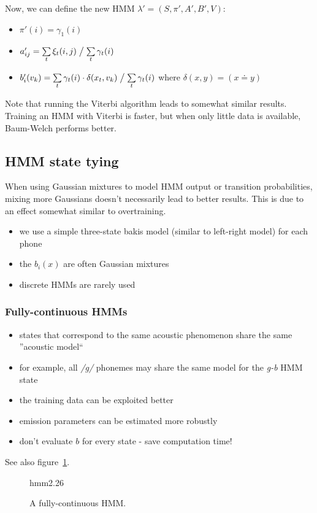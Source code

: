 \documentclass[11pt]{article}
\begin{document}
Now, we can define the new HMM $\lambda' = (S, \pi', A', B', V)$:
\begin{itemize}
    \item $\pi'(i) = \gamma_1(i)$
    \item $a'_{ij} = \sum\limits_t \xi_t(i, j) \bigm/ \sum\limits_t \gamma_t(i)$
    \item $b'_i(v_k) = \sum\limits_t \gamma_t(i) \cdot \delta(x_t, v_k) \bigm/ \sum\limits_t \gamma_t(i)$ where $\delta(x, y) = (x \doteq y)$
\end{itemize}

Note that running the Viterbi algorithm leads to somewhat similar results. Training an HMM with Viterbi is faster, but when only little data is available, Baum-Welch performs better.

\subsection{HMM state tying}

When using Gaussian mixtures to model HMM output or transition probabilities, mixing more Gaussians doesn't necessarily lead to better results. This is due to an effect somewhat similar to overtraining.

\begin{itemize}
    \item we use a simple three-state bakis model (similar to left-right model) for each phone
    \item the $b_i(x)$ are often Gaussian mixtures
    \item discrete HMMs are rarely used
\end{itemize}

\subsubsection{Fully-continuous HMMs}
\begin{itemize}
    \item states that correspond to the same acoustic phenomenon share the same ''acoustic model``
    \item for example, all \textit{/g/} phonemes may share the same model for the \textit{g-b} HMM state
    \item the training data can be exploited better
    \item emission parameters can be estimated more robustly
    \item don't evaluate $b$ for every state - save computation time!
\end{itemize}
See also figure~\ref{fig:fullyContinuousHMMs}.
\begin{figure}[htb]
    \begin{minipage}{\linewidth}
        \vspace{6cm}
        \hfill \scriptsize hmm2.26
    \end{minipage}
    \caption{\label{fig:fullyContinuousHMMs} A fully-continuous HMM.}
\end{figure}
\end{document}
